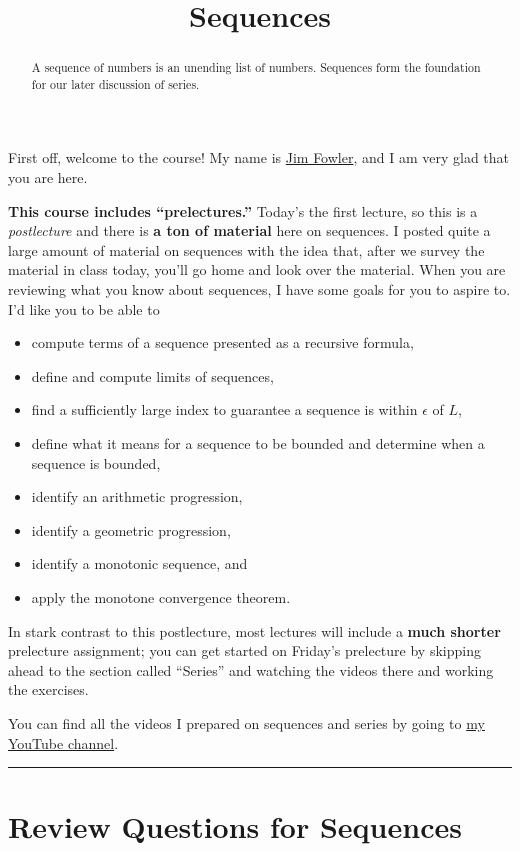 \documentclass{ximera}
\title{Sequences}
\begin{document}
\begin{abstract}
  A sequence of numbers is an unending list of numbers.  Sequences form the foundation for our later discussion of series.
\end{abstract}

\maketitle

First off, welcome to the course!  My name is \href{http://kisonecat.com/}{Jim Fowler}, and I am very glad that you are here.

\textbf{This course includes ``prelectures.''}  Today's the first
lecture, so this is a \textit{postlecture} and there is \textbf{a ton
  of material} here on sequences.  I posted quite a large amount of
material on sequences with the idea that, after we survey the material
in class today, you'll go home and look over the material.  When you
are reviewing what you know about sequences, I have some goals for you
to aspire to.  I'd like you to be able to
\begin{itemize}
\item compute terms of a sequence presented as a recursive formula,
\item define and compute limits of sequences,
\item find a sufficiently large index to guarantee a sequence is within \(\epsilon\) of \(L\),
\item define what it means for a sequence to be bounded and determine when a sequence is bounded,
\item identify an arithmetic progression,
\item identify a geometric progression,
\item identify a monotonic sequence, and
\item apply the monotone convergence theorem.
\end{itemize}
In stark contrast to this postlecture, most lectures will include a
\textbf{much shorter} prelecture assignment; you can get started on
Friday's prelecture by skipping ahead to the section called ``Series''
and watching the videos there and working the exercises.

You can find all the videos I prepared on sequences and series by going to \href{https://www.youtube.com/playlist?list=PLjOkVtsM_edJgB9yG6fRb5VXsoSxQN0L5}{my YouTube channel}.

\hrule

\section{Review Questions for Sequences}
\end{document}
